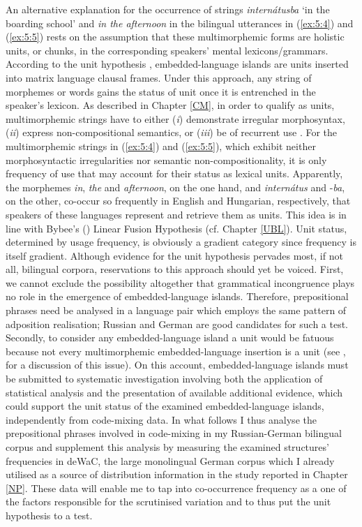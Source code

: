 An alternative explanation for the occurrence of strings \textit{internátusba} `in the boarding school' and \textit{in the afternoon} in the bilingual utterances in (\ref{ex:5:4}) and (\ref{ex:5:5}) rests on the assumption that these multimorphemic forms are holistic units, or chunks, in the corresponding speakers' mental lexicons/grammars. According to the unit hypothesis \citep{backus-evidence-1999,backus-units-2003}, embedded-language islands are units inserted into matrix language clausal frames. Under this approach, any string of morphemes or words gains the status of unit once it is entrenched in the speaker's lexicon. As described in Chapter \ref{CM}, in order to qualify as units, multimorphemic strings have to either (\textit{i}) demonstrate irregular morphosyntax, (\textit{ii}) express non-compositional semantics, or (\textit{iii}) be of recurrent use \citep[90]{backus-units-2003}. For the multimorphemic strings in (\ref{ex:5:4}) and (\ref{ex:5:5}), which exhibit neither morphosyntactic irregularities nor semantic non-compositionality, it is only frequency of use that may account for their status as lexical units. Apparently, the morphemes \textit{in}, \textit{the} and \textit{afternoon}, on the one hand, and \textit{internátus} and -\textit{ba}, on the other, co-occur so frequently in English and Hungarian, respectively, that speakers of these languages represent and retrieve them as units. This idea is in line with Bybee's (\citeyear{bybee-constituency-2002}) Linear Fusion Hypothesis (cf. Chapter \ref{UBL}). Unit status, determined by usage frequency, is obviously a gradient category since frequency is itself gradient. Although evidence for the unit hypothesis pervades most, if not all, bilingual corpora, reservations to this approach should yet be voiced. First, we cannot exclude the possibility altogether that grammatical incongruence plays no role in the emergence of embedded-language islands. Therefore, prepositional phrases need be analysed in a language pair which employs the same pattern of adposition realisation; Russian and German are good candidates for such a test. Secondly, to consider any embedded-language island a unit would be fatuous because not every multimorphemic embedded-language insertion is a unit (see , for a discussion of this issue). On this account, embedded-language islands must be submitted to systematic investigation involving both the application of statistical analysis and the presentation of available additional evidence, which could support the unit status of the examined embedded-language islands, independently from code-mixing data. In what follows I thus analyse the prepositional phrases involved in code-mixing in my Russian-German bilingual corpus and supplement this analysis by measuring the  examined structures’ frequencies in deWaC, the large monolingual German corpus \citep{baroni2006} which I already utilised as a source of distribution information in the study reported in Chapter \ref{NP}. These data will enable me to tap into co-occurrence frequency as a one of the factors responsible for the scrutinised variation and to thus put the unit hypothesis to a test.

